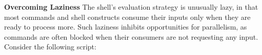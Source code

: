 \documentclass[letterpaper,twocolumn,10pt]{article}
\newcommand{\heading}[1]{\vspace{4pt}\noindent\textbf{#1}\enspace}
\newcommand{\nv}[1]{[{\color{cyan}nv: #1}]}
\newcommand{\kk}[1]{[{\color{magenta}kk: #1}]}
\begin{document}




% 
% 
% 
% 
% 
%




\heading{Overcoming Laziness}
The shell's evaluation strategy is unusually lazy, in that most commands and shell constructs consume their inputs only when they are ready to process more.
Such laziness inhibits opportunities for parallelism, as commands are often blocked when their consumers are not requesting any input.
Consider the following script:
\end{document}
